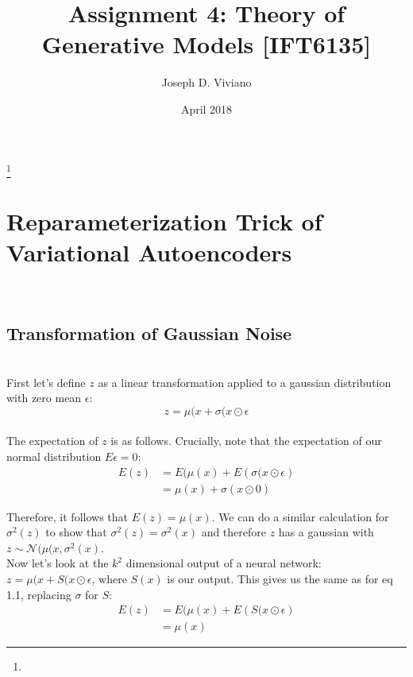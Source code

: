 \documentclass{amsart}
\numberwithin{equation}{section}
\theoremstyle{definition}
\theoremstyle{remark}
\begin{document}
\title{Assignment 4: Theory of Generative Models [IFT6135]}

\author{Joseph D. Viviano}
\address{Universit\'e de Montr\'eal}
\curraddr{}
\thanks{}
\date{April 2018}

\maketitle

\section{Reparameterization Trick of Variational Autoencoders} \\

\subsection{Transformation of Gaussian Noise} \\

First let's define $z$ as a linear transformation applied to a gaussian 
distribution with zero mean $\epsilon$: \\

$$z= \mu(x+ \sigma(x\odot\epsilon$$ \\

The expectation of $z$ is as follows. Crucially, note that the expectation
of our normal distribution $E\epsilon = 0$: \\

\begin{equation}
\begin{split}
E(z)
&= E(\mu(x)+E\left(\sigma(x\odot \epsilon\right)\\
&= \mu(x)+ \sigma(x\odot 0)
\end{split}
\end{equation}

Therefore, it follows that $ E(z) = \mu(x) $. We can do a 
similar calculation for $\sigma^2(z)$ to show that $\sigma^2(z) = \sigma^2(x)$
and therefore $z$ has a gaussian with $z\sim \mathcal{N}(\mu(x, \sigma^2(x)$.\\

Now let's look at the $k^2$ dimensional output of a neural network: 
$z = \mu(x + S(x\odot\epsilon $, where $S(x)$ is our
output. This gives us the same as for eq 1.1, replacing $\sigma$ for $S$: \\ 

\begin{equation}
\begin{split}
E(z)&= E(\mu(x)+E\left(S(x\odot \epsilon\right) \\
&= \mu(x)
\end{split}
\end{equation}
\end{document}
